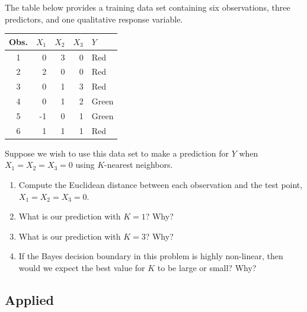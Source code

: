 \documentclass[12pt]{report}
\begin{document}
\begin{exercise}
The table below provides a training data set containing six observations, three predictors, and one qualitative response variable.
\begin{center}
\begin{tabular}{c|rrrl}
\hline
Obs. & $X_{1}$ & $X_{2}$ & $X_{3}$ & $Y$ \\
\hline
1 & 0 & 3 & 0 & Red \\
2 & 2 & 0 & 0 & Red \\
3 & 0 & 1 & 3 & Red \\
4 & 0 & 1 & 2 & Green \\
5 & -1 & 0 & 1 & Green \\
6 & 1 & 1 & 1 & Red \\
\hline
\end{tabular}
\end{center}
Suppose we wish to use this data set to make a prediction for $Y$ when $X_{1}=X_{2}=X_{3}=0$ using $K$-nearest neighbors.
\begin{enumerate}
    \item[(a)] Compute the Euclidean distance between each observation and the test point, $X_{1}=X_{2}=X_{3}=0$.
    \item[(b)] What is our prediction with $K=1$? Why?
    \item[(c)] What is our prediction with $K=3$? Why?
    \item[(d)] If the Bayes decision boundary in this problem is highly non-linear, then would we expect the best value for $K$ to be large or small? Why?
\end{enumerate}
\end{exercise}

\subsection*{\color{codeblue}Applied}
\end{document}
